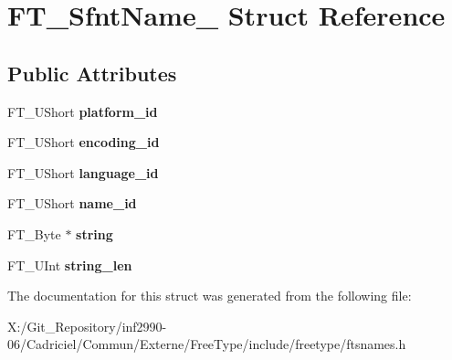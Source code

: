 \hypertarget{struct_f_t___sfnt_name__}{\section{F\-T\-\_\-\-Sfnt\-Name\-\_\- Struct Reference}
\label{struct_f_t___sfnt_name__}
}
\subsection*{Public Attributes}
\begin{DoxyCompactItemize}
\item 
\hypertarget{struct_f_t___sfnt_name___ae92450a058eb4737df85f66226d69f43}{F\-T\-\_\-\-U\-Short {\bfseries platform\-\_\-id}}\label{struct_f_t___sfnt_name___ae92450a058eb4737df85f66226d69f43}

\item 
\hypertarget{struct_f_t___sfnt_name___a01f4573605eab3f4d2e4b9b50b0de98f}{F\-T\-\_\-\-U\-Short {\bfseries encoding\-\_\-id}}\label{struct_f_t___sfnt_name___a01f4573605eab3f4d2e4b9b50b0de98f}

\item 
\hypertarget{struct_f_t___sfnt_name___a6fb23e0f299a97b25b63805b04cf1fc5}{F\-T\-\_\-\-U\-Short {\bfseries language\-\_\-id}}\label{struct_f_t___sfnt_name___a6fb23e0f299a97b25b63805b04cf1fc5}

\item 
\hypertarget{struct_f_t___sfnt_name___ac07be3e852408990fe0a910f00b68f4e}{F\-T\-\_\-\-U\-Short {\bfseries name\-\_\-id}}\label{struct_f_t___sfnt_name___ac07be3e852408990fe0a910f00b68f4e}

\item 
\hypertarget{struct_f_t___sfnt_name___ab369e2c3d8dc9662f69c53e4d3158067}{F\-T\-\_\-\-Byte $\ast$ {\bfseries string}}\label{struct_f_t___sfnt_name___ab369e2c3d8dc9662f69c53e4d3158067}

\item 
\hypertarget{struct_f_t___sfnt_name___a4ebdb7207b5681d16f9cc17f432cb56f}{F\-T\-\_\-\-U\-Int {\bfseries string\-\_\-len}}\label{struct_f_t___sfnt_name___a4ebdb7207b5681d16f9cc17f432cb56f}

\end{DoxyCompactItemize}


The documentation for this struct was generated from the following file\-:\begin{DoxyCompactItemize}
\item 
X\-:/\-Git\-\_\-\-Repository/inf2990-\/06/\-Cadriciel/\-Commun/\-Externe/\-Free\-Type/include/freetype/ftsnames.\-h\end{DoxyCompactItemize}

